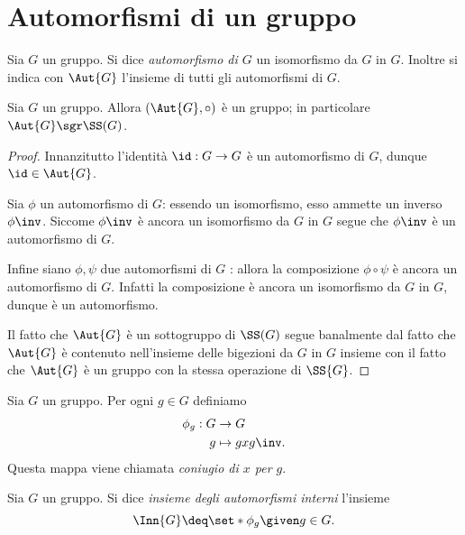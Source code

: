 \section{Automorfismi di un gruppo}

\begin{definition}
    [Automorfismo] Sia $G$ un gruppo. Si dice \emph{automorfismo di $G$} un isomorfismo da $G$ in $G$.
    Inoltre si indica con $\Aut{G}$ l'insieme di tutti gli automorfismi di $G$.
\end{definition}

\begin{proposition}
     Sia $G$ un gruppo. Allora $(\Aut{G}, \circ)$ è un gruppo;
    in particolare $\Aut{G} \sgr \SS(G)$.
\end{proposition}
\begin{proof}
    Innanzitutto l'identità $\id : G \to G$ è un automorfismo di $G$, dunque $\id \in \Aut{G}$.

    Sia $\phi$ un automorfismo di $G$: essendo un isomorfismo, esso ammette un inverso $\phi\inv$. 
    Siccome $\phi\inv$ è ancora un isomorfismo da $G$ in $G$ segue che $\phi\inv$ è un automorfismo di $G$.

    Infine siano $\phi, \psi$ due automorfismi di $G$ : allora la composizione $\phi \circ \psi$ è ancora un automorfismo di $G$.
    Infatti la composizione è ancora un isomorfismo da $G$ in $G$, dunque è un automorfismo.

    Il fatto che $\Aut{G}$ è un sottogruppo di $\SS(G)$ segue banalmente dal fatto che 
    $\Aut{G}$ è contenuto nell'insieme delle bigezioni da $G$ in $G$ 
    insieme con il fatto che $\Aut{G}$ è un gruppo con la stessa operazione di $\SS{G}$.
\end{proof}

\begin{definition}
    Sia $G$ un gruppo. Per ogni $g \in G$ definiamo 
    \begin{align*}
        \phi_g : G &\to G\\
        g &\mapsto gxg\inv.
    \end{align*} Questa mappa viene chiamata \emph{coniugio di $x$ per $g$}.
\end{definition}

\begin{definition}
    Sia $G$ un gruppo. Si dice \emph{insieme degli automorfismi interni} l'insieme \[
        \Inn{G} \deq \set*{\phi_g \given g \in G}.    
    \]
\end{definition}

